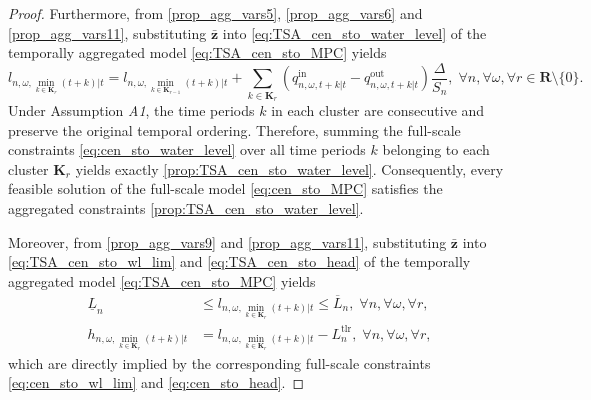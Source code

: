 \documentclass[10pt,a4paper]{amsart}
\begin{document}
\begin{proof}
Furthermore, from \eqref{prop_agg_vars5}, \eqref{prop_agg_vars6} and \eqref{prop_agg_vars11},
substituting $\boldsymbol{\bar{z}}$ into \eqref{eq:TSA_cen_sto_water_level}
of the temporally aggregated model \eqref{eq:TSA_cen_sto_MPC} yields
\begin{equation}
l_{n,\omega, \min_{k \in \boldsymbol{K}_r}(t+k)|t}
=
l_{n,\omega, \min_{k \in \boldsymbol{K}_{r-1}}(t+k)|t} +
\sum_{k \in \boldsymbol{K}_r}
\left(q^{\mathrm{in}}_{n,\omega,t+k|t} - q^{\mathrm{out}}_{n,\omega,t+k|t}\right)
\frac{\Delta}{S_n}, \; \forall n, \forall \omega, \forall r \in \boldsymbol{R} \setminus \{0\}.
\label{prop:TSA_cen_sto_water_level}
\end{equation}
Under Assumption \textit{A1}, the time periods $k$ in each cluster are consecutive and preserve the original temporal ordering.
Therefore, summing the full-scale constraints \eqref{eq:cen_sto_water_level} over all time periods $k$ belonging to each cluster $\boldsymbol{K}_r$ yields exactly \eqref{prop:TSA_cen_sto_water_level}.
Consequently, every feasible solution of the full-scale model \eqref{eq:cen_sto_MPC} satisfies the aggregated constraints \eqref{prop:TSA_cen_sto_water_level}.

Moreover, from \eqref{prop_agg_vars9} and \eqref{prop_agg_vars11}, substituting $\boldsymbol{\bar{z}}$ into
\eqref{eq:TSA_cen_sto_wl_lim} and \eqref{eq:TSA_cen_sto_head} of the temporally aggregated model
\eqref{eq:TSA_cen_sto_MPC} yields
\begin{align}
\underline{L}_{n} & \leq
l_{n,\omega, \min_{k \in \boldsymbol{K}_r}(t+k)|t}
\leq \overline{L}_{n},
\; \forall n, \forall \omega, \forall r,
\label{prop:TSA_cen_sto_wl_lim}\\
h_{n,\omega, \min_{k \in \boldsymbol{K}_r}(t+k)|t} & =
l_{n,\omega, \min_{k \in \boldsymbol{K}_r}(t+k)|t} - L^{\mathrm{tlr}}_{n},
\; \forall n, \forall \omega, \forall r,
\label{prop:TSA_cen_sto_head}
\end{align}
which are directly implied by the corresponding full-scale constraints \eqref{eq:cen_sto_wl_lim} and \eqref{eq:cen_sto_head}.


\end{proof}
\end{document}

